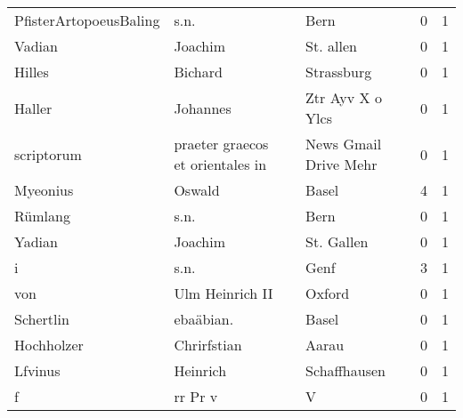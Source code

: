 \begin{center}
\begin{tiny}
\begin{longtabu}{llllrr}
   PfisterArtopoeusBaling &                               s.n. &             &                                        Bern &          0 &         1 \\
                   Vadian &                            Joachim &             &                                   St. allen &          0 &         1 \\
                   Hilles &                            Bichard &             &                                  Strassburg &          0 &         1 \\
                   Haller &                           Johannes &             &                            Ztr Ayv X o Ylcs &          0 &         1 \\
               scriptorum &   praeter graecos et orientales in &             &                       News Gmail Drive Mehr &          0 &         1 \\
                 Myeonius &                             Oswald &             &                                       Basel &          4 &         1 \\
                  Rümlang &                               s.n. &             &                                        Bern &          0 &         1 \\
                   Yadian &                            Joachim &             &                                  St. Gallen &          0 &         1 \\
                        i &                               s.n. &             &                                        Genf &          3 &         1 \\
                      von &                    Ulm Heinrich II &             &                                      Oxford &          0 &         1 \\
                Schertlin &                          ebaäbian. &             &                                       Basel &          0 &         1 \\
               Hochholzer &                        Chrirfstian &             &                                       Aarau &          0 &         1 \\
                  Lfvinus &                           Heinrich &             &                                Schaffhausen &          0 &         1 \\
                        f &                            rr Pr v &             &                                           V &          0 &         1 \\

\end{longtabu}
\end{tiny}
\end{center}
